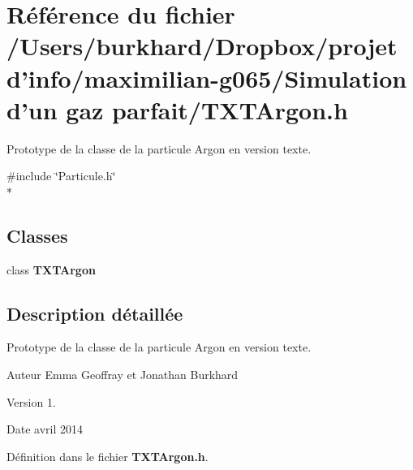 \section{Référence du fichier /\+Users/burkhard/\+Dropbox/projet d'info/maximilian-\/g065/\+Simulation d'un gaz parfait/\+T\+X\+T\+Argon.h}
\label{_t_x_t_argon_8h}


Prototype de la classe de la particule Argon en version texte.  


{\ttfamily \#include \char`\"{}Particule.\+h\char`\"{}}\\*
\subsection*{Classes}
\begin{DoxyCompactItemize}
\item 
class {\bf T\+X\+T\+Argon}
\end{DoxyCompactItemize}


\subsection{Description détaillée}
Prototype de la classe de la particule Argon en version texte. 

\begin{DoxyAuthor}{Auteur}
Emma Geoffray et Jonathan Burkhard 
\end{DoxyAuthor}
\begin{DoxyVersion}{Version}
1. 
\end{DoxyVersion}
\begin{DoxyDate}{Date}
avril 2014 
\end{DoxyDate}


Définition dans le fichier {\bf T\+X\+T\+Argon.\+h}.

